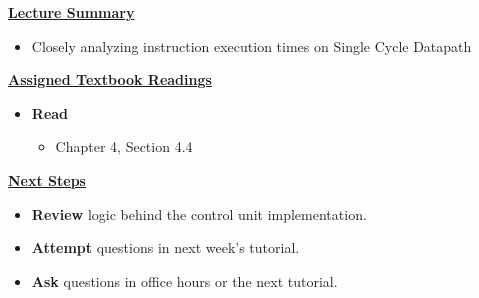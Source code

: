 \begin{frame}[fragile]
 \underline{\textbf{Lecture Summary}}
 \begin{itemize}
 \item Closely analyzing instruction execution times on Single Cycle Datapath 
\end{itemize}
 \underline{\textbf{Assigned Textbook Readings}}
\begin{itemize}
     \item \textbf{Read} 
     \begin{itemize}
     \item Chapter 4, Section 4.4
     \end{itemize}
     \end{itemize}
    \underline{\textbf{Next Steps}}
    \begin{itemize}
     \item \textbf{Review} logic behind the control unit implementation. 
\item \textbf{Attempt} questions in next week's tutorial. 
    \item \textbf{Ask} questions in office hours or the next tutorial.
 \end{itemize}

\end{frame}